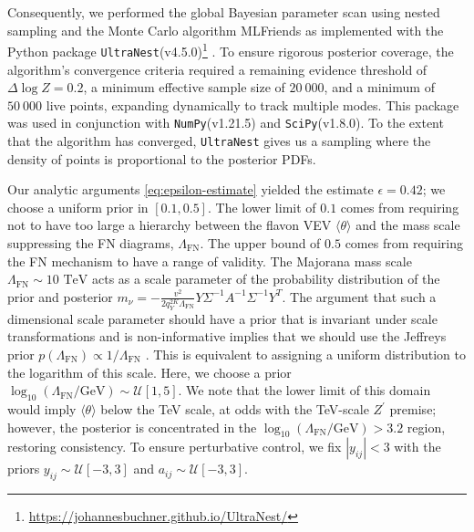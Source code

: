 \documentclass[11pt,letterpaper]{article}
\begin{document}
Consequently, we 
performed the global Bayesian parameter scan using nested sampling and the
Monte Carlo algorithm 
MLFriends \cite{Buchner:2014qmx, Buchner_2019} as
implemented with the Python package
\texttt{UltraNest}(v4.5.0)\footnote{\url{https://johannesbuchner.github.io/UltraNest/}}
\cite{buchner2021ultranestrobustgeneral}. To ensure rigorous posterior coverage, the algorithm's convergence criteria required a remaining evidence threshold of $\Delta \log Z = 0.2$, a minimum effective sample size of $20\ 000$, and a minimum of $50\ 000$ live points, expanding dynamically to track multiple modes. This package was used in conjunction with \texttt{NumPy}(v1.21.5) and \texttt{SciPy}(v1.8.0). To the extent that the algorithm has converged,
     {\tt UltraNest} gives us a sampling where the density of points is
     proportional to the posterior PDFs.

Our analytic arguments \cref{eq:epsilon-estimate} yielded the estimate
$\epsilon = 0.42$; we 
choose a uniform prior in $[0.1,0.5]$. The lower limit of $0.1$ comes
from requiring not to have too large a hierarchy between the flavon VEV
$\langle\theta\rangle$ and the mass scale suppressing the FN diagrams, $\Lambda_{\text{FN}}$.
The upper bound of $0.5$ comes from requiring the FN mechanism to have a range
of validity.
The Majorana mass scale
$\Lambda_{\text{FN}}\sim 10\text{~TeV}$ acts as a scale parameter of the
probability distribution of the prior and 
posterior $m_\nu= -\frac{v^2}{2q_Y^{2K}\Lambda_{\text{FN}}}Y \Sigma^{-1}A^{-1}\Sigma^{-1}Y^T$. The argument that such a dimensional scale parameter should have a
prior that is invariant under scale transformations and is non-informative
implies that we should use the Jeffreys prior $p(\Lambda_{\text{FN}}) \propto 1/\Lambda_{\text{FN}}$
\cite{jeffreys_invariant_1946}. This is equivalent to assigning a uniform
distribution to the logarithm of this scale. Here, we choose a prior
$\log_{10}(\Lambda_{\text{FN}}/\text{GeV})\sim \mathcal{U}[1,5]$.
We note that the lower limit of this domain would imply $\langle \theta
\rangle$ below the TeV scale, at odds with the TeV-scale $Z^\prime$ premise;
however, the posterior is concentrated in the
$\log_{10}(\Lambda_{\text{FN}}/\text{GeV})>3.2$ region, restoring consistency.
To ensure perturbative control, we fix $|y_{ij}|<3$
with the priors $y_{ij} \sim \mathcal{U}[-3,3]$ and $a_{ij} \sim
\mathcal{U}[-3,3]$.
\end{document}
